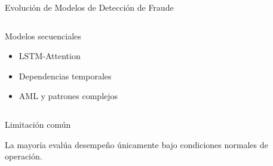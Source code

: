 \documentclass[aspectratio=169, 8pt]{beamer}
\begin{document}
\begin{frame}{Evolución de Modelos de Detección de Fraude}
\begin{columns}
\vspace{0.15cm}

\begin{block}{Modelos secuenciales}

\begin{itemize}

\item LSTM-Attention

\item Dependencias temporales

\item AML y patrones complejos

\end{itemize}

\end{block}

\end{columns}

\vspace{0.25cm}

\begin{alertblock}{Limitación común}

La mayoría evalúa desempeño únicamente
bajo condiciones normales de operación.

\end{alertblock}

\end{frame}
\end{document}
